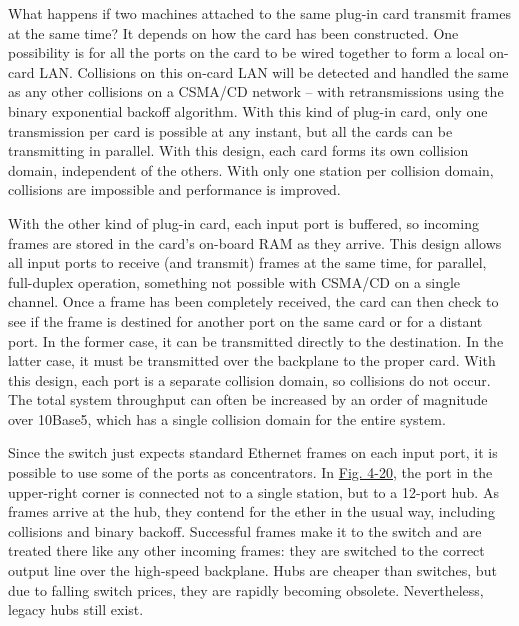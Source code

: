 \documentclass[b5paper,11pt]{memoir}
\begin{document}
What happens if two machines attached to the same plug-in card transmit
frames at the same time? It depends on how the card has been
constructed. One possibility is for all the ports on the card to be
wired together to form a local on-card LAN. Collisions on this on-card
LAN will be detected and handled the same as any other collisions on a
CSMA/CD network -- with retransmissions using the binary exponential
backoff algorithm. With this kind of plug-in card, only one transmission
per card is possible at any instant, but all the cards can be
transmitting in parallel. With this design, each card forms its own
{collision domain}, independent of the others. With only one station per
collision domain, collisions are impossible and performance is improved.

With the other kind of plug-in card, each input port is buffered, so
incoming frames are stored in the card's on-board RAM as they arrive.
This design allows all input ports to receive (and transmit) frames at
the same time, for parallel, full-duplex operation, something not
possible with CSMA/CD on a single channel. Once a frame has been
completely received, the card can then check to see if the frame is
destined for another port on the same card or for a distant port. In the
former case, it can be transmitted directly to the destination. In the
latter case, it must be transmitted over the backplane to the proper
card. With this design, each port is a separate collision domain, so
collisions do not occur. The total system throughput can often be
increased by an order of magnitude over 10Base5, which has a single
collision domain for the entire system.

Since the switch just expects standard Ethernet frames on each input
port, it is possible to use some of the ports as concentrators. In
\protect\hyperlink{0130661023_ch04lev1sec3.htmlux5cux23ch04fig20}{Fig.
4-20}, the port in the upper-right corner is connected not to a single
station, but to a 12-port hub. As frames arrive at the hub, they contend
for the ether in the usual way, including collisions and binary backoff.
Successful frames make it to the switch and are treated there like any
other incoming frames: they are switched to the correct output line over
the high-speed backplane. Hubs are cheaper than switches, but due to
falling switch prices, they are rapidly becoming obsolete. Nevertheless,
legacy hubs still exist.

\protect\hypertarget{0130661023_ch04lev1sec3.htmlux5cux23ch04lev2sec15}{}{}
\end{document}
